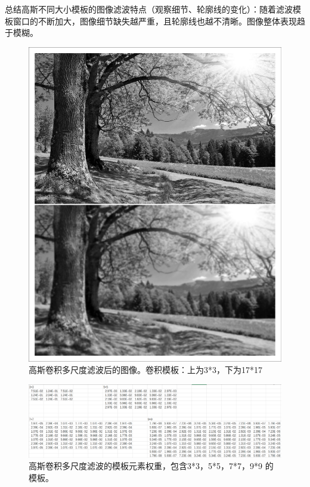\documentclass[10pt,twocolumn,letterpaper]{article}
\begin{document}
总结高斯不同大小模板的图像滤波特点（观察细节、轮廓线的变化）：随着滤波模板窗口的不断加大，图像细节缺失越严重，且轮廓线也越不清晰。图像整体表现趋于模糊。

\begin{figure}[th]
   \centering
   \includegraphics[width=0.95\linewidth]{GaussScale2.pdf}
   \caption{高斯卷积多尺度滤波后的图像。卷积模板：上为3*3，下为17*17}   
   \label{fig:GaussScale2}
\end{figure}


\clearpage


\begin{figure}[th]
   \centering
   \includegraphics[width=0.95\linewidth]{matrix1.png}
   \caption{高斯卷积多尺度滤波的模板元素权重，包含3*3，5*5，7*7，9*9 的模板。}   
   \label{fig:matrix1}
\end{figure}
\end{document}
